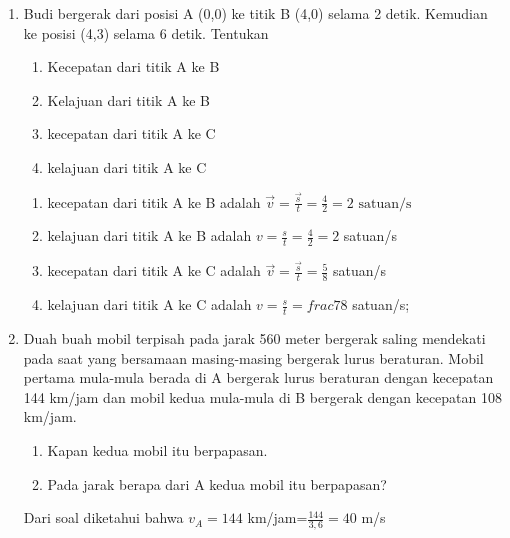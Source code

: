\documentclass[10pt,a4paper]{article}
\newcommand{\unhide}[1]{
\begin{mybox}
#1\end{mybox}}
\begin{document}
\begin{multicols*}{2}
\begin{enumerate}[topsep=0pt,itemsep=0pt,leftmargin=*]
\item Budi bergerak dari posisi A (0,0) ke titik B (4,0) selama 2 detik. Kemudian ke posisi (4,3) selama 6 detik. Tentukan
\begin{enumerate}[itemsep=0pt, topsep=0pt,label=\alph*.]
\item Kecepatan dari titik A ke B
\item Kelajuan dari titik A ke B
\item kecepatan dari titik A ke C
\item kelajuan dari titik A ke C
\end{enumerate}
\unhide{
\begin{enumerate}[itemsep=0pt, topsep=0pt,label=\alph*.]
\item kecepatan dari titik A ke B adalah $\vec{v}=\frac{\vec{s}}{t}=\frac{4}{2}=2 \text{ satuan/s}$
\item kelajuan dari titik A ke B adalah $v=\frac{s}{t} = \frac{4}{2} =2$ satuan/s
\item kecepatan dari titik A ke C adalah $\vec{v}=\frac{\vec{s}}{t}=\frac{5}{8}$ satuan/s
\item kelajuan dari titik A ke C adalah $v=\frac{s}{t}=frac{7}{8}$ satuan/s;
\end{enumerate}
}
\item Duah buah mobil terpisah pada jarak 560 meter bergerak saling mendekati pada saat yang bersamaan masing-masing bergerak lurus beraturan. Mobil pertama mula-mula berada di A bergerak lurus beraturan dengan kecepatan 144 km/jam dan mobil kedua mula-mula di B bergerak dengan kecepatan 108 km/jam.
  \begin{enumerate}[label=\alph*,topsep=0pt,itemsep=0pt]
  \item Kapan kedua mobil itu berpapasan.

  \item Pada jarak berapa dari A kedua mobil itu berpapasan?
   \end{enumerate}
\unhide{
Dari soal diketahui bahwa $v_A=144$ km/jam=$\frac{144}{3,6}= 40$ m/s

}
\end{enumerate}
\end{multicols*}
\end{document}
